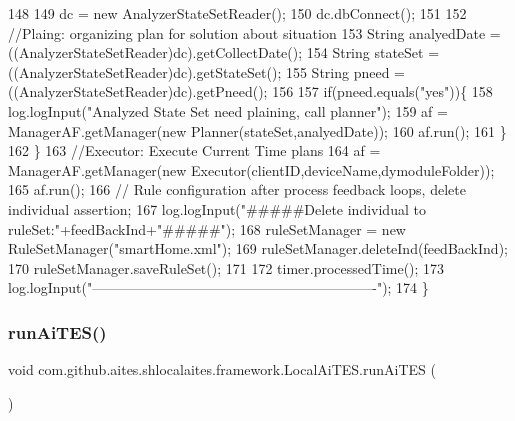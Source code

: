 \begin{DoxyCode}
148             
149             dc = \textcolor{keyword}{new} AnalyzerStateSetReader();
150             dc.dbConnect();
151             
152             \textcolor{comment}{//Plaing: organizing plan for solution about situation}
153             String analyedDate = ((AnalyzerStateSetReader)dc).getCollectDate();
154             String stateSet = ((AnalyzerStateSetReader)dc).getStateSet();
155             String pneed = ((AnalyzerStateSetReader)dc).getPneed();
156 
157             \textcolor{keywordflow}{if}(pneed.equals(\textcolor{stringliteral}{"yes"}))\{
158                 log.logInput(\textcolor{stringliteral}{"Analyzed State Set need plaining, call planner"});
159                 af = ManagerAF.getManager(\textcolor{keyword}{new} Planner(stateSet,analyedDate));
160                 af.run();
161             \}
162         \}
163         \textcolor{comment}{//Executor: Execute Current Time plans}
164         af = ManagerAF.getManager(\textcolor{keyword}{new} Executor(clientID,deviceName,dymoduleFolder));
165         af.run();
166         \textcolor{comment}{// Rule configuration after process feedback loops, delete individual assertion;}
167         log.logInput(\textcolor{stringliteral}{"#####Delete individual to ruleSet:"}+feedBackInd+\textcolor{stringliteral}{"#####"});
168         ruleSetManager = \textcolor{keyword}{new} RuleSetManager(\textcolor{stringliteral}{"smartHome.xml"});
169         ruleSetManager.deleteInd(feedBackInd);
170         ruleSetManager.saveRuleSet();
171         
172         timer.processedTime();
173         log.logInput(\textcolor{stringliteral}{"-------------------------------------------------------------"});
174     \}
\end{DoxyCode}
\mbox{\label{classcom_1_1github_1_1aites_1_1shlocalaites_1_1framework_1_1_local_ai_t_e_s_abc44ebc127ef39aa8e39c690b92d435a}} 
\subsubsection{\texorpdfstring{run\+Ai\+T\+E\+S()}{runAiTES()}}
{\footnotesize\ttfamily void com.\+github.\+aites.\+shlocalaites.\+framework.\+Local\+Ai\+T\+E\+S.\+run\+Ai\+T\+ES (\begin{DoxyParamCaption}{ }\end{DoxyParamCaption})}



